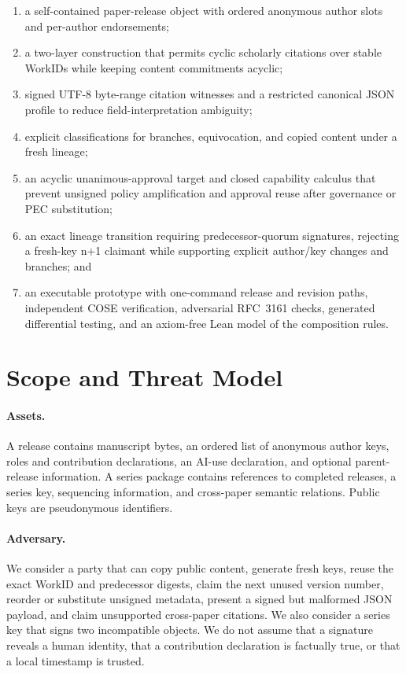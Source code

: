 \documentclass[11pt]{article}
\newcommand{\workid}{\textsf{WorkID}}
\begin{document}
\begin{enumerate}
  \item a self-contained paper-release object with ordered anonymous author slots and per-author endorsements;
  \item a two-layer construction that permits cyclic scholarly citations over stable \workid s while keeping content commitments acyclic;
  \item signed UTF-8 byte-range citation witnesses and a restricted canonical JSON profile to reduce field-interpretation ambiguity;
  \item explicit classifications for branches, equivocation, and copied content under a fresh lineage;
  \item an acyclic unanimous-approval target and closed capability calculus that prevent unsigned policy amplification and approval reuse after governance or PEC substitution;
  \item an exact lineage transition requiring predecessor-quorum signatures, rejecting a fresh-key n+1 claimant while supporting explicit author/key changes and branches; and
  \item an executable prototype with one-command release and revision paths, independent COSE verification, adversarial RFC~3161 checks, generated differential testing, and an axiom-free Lean model of the composition rules.
\end{enumerate}

\section{Scope and Threat Model}

\paragraph{Assets.} A release contains manuscript bytes, an ordered list of anonymous author keys, roles and contribution declarations, an AI-use declaration, and optional parent-release information. A series package contains references to completed releases, a series key, sequencing information, and cross-paper semantic relations. Public keys are pseudonymous identifiers.

\paragraph{Adversary.} We consider a party that can copy public content, generate fresh keys, reuse the exact WorkID and predecessor digests, claim the next unused version number, reorder or substitute unsigned metadata, present a signed but malformed JSON payload, and claim unsupported cross-paper citations. We also consider a series key that signs two incompatible objects. We do not assume that a signature reveals a human identity, that a contribution declaration is factually true, or that a local timestamp is trusted.
\end{document}
